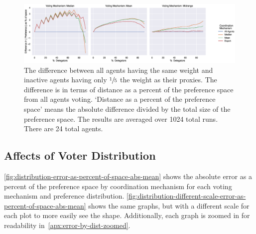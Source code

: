 \begin{landscape}
    \begin{figure}[p]
        \centering
        \includegraphics[scale=0.55]
        {content/chapter2/figures/different_weight/difference_abs_pref_percent_of_space}
        \caption{
            The difference between all agents having the same weight and inactive
            agents having only $\sfrac{1}{5}$ the weight as their proxies.
            The difference is in terms of distance as a percent of the preference
            space from all agents voting.
            `Distance as a percent of the preference space' means the absolute
            difference divided by the total size of the preference space.
            The results are averaged over 1024 total runs.
            There are 24 total agents.
        }
        \label{fig:different-weight-comparison}
    \end{figure}
\end{landscape}

\subsection{Affects of Voter Distribution}\label{subsec:results-distribution}
\autoref{fig:distribution-error-as-percent-of-space-abs-mean} shows
the absolute error as a percent of the preference space by coordination mechanism for
each voting mechanism and preference distribution.
\autoref{fig:distribution-different-scale-error-as-percent-of-space-abs-mean} shows
the same graphs, but with a different scale for each plot to more easily see the shape.
Additionally, each graph is zoomed in for readability
in~\autoref{apx:error-by-dist-zoomed}.


